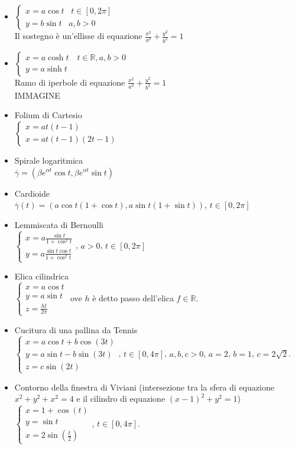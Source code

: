 \documentclass{article}
\newcommand{\R}{\mathbb{R}}
\begin{document}
\begin{itemize}
    \item $\begin{cases}
    x=a \cos t\,\,\,\,\, t \in [0,2\pi]\\
    y= b \sin t\,\,\,\,\, a,b >0
\end{cases}$\\
Il sostegno è un'ellisse di equazione $\frac{x^2}{a^2}+\frac{y^2}{b^2}=1$
    \item $\begin{cases}
        x=a \cosh t\,\,\,\,\,\, t \in \R, a,b>0\\
        y=a \sinh t
    \end{cases}$\\
    Ramo di iperbole di equazione $\frac{x^2}{a^2}+\frac{y^2}{b^2}=1$\\
    IMMAGINE
\item Folium di Cartesio\\
$\begin{cases}
    x= a t(t-1)\\
    x=a t(t-1)(2t-1)
\end{cases}$
\item Spirale logaritmica\\
$ \overline{\gamma}= (\beta e^{\alpha t}\cos t, \beta e^{\alpha t} \sin t)$
\item Cardioide\\
$\overline{\gamma}(t)=(a \cos t (1+\cos t), a \sin t (1+\sin t))$, $t \in [0, 2\pi]$
\item Lemmiscata di Bernoulli\\
$\begin{cases}
    x=a \frac{\sin t}{1+\cos^2 t}\\
    y=a \frac{\sin t \cos t}{1+\cos^2 t}
\end{cases}$, $a >0$, $ t \in [0, 2 \pi]$
\item Elica cilindrica\\
$\begin{cases}
    x=a\cos t\\
    y=a \sin t \\
    z= \frac{ht}{2\pi}
\end{cases}$ ove $h $ è detto passo dell'elica $f \in \R$.
\item Cucitura di una pallina da Tennis\\
$\begin{cases}
    x=a \cos t+ b \cos (3t)\\
    y=a \sin t - b \sin (3t)\\
    z=c \sin (2t)
\end{cases}$, $t\in [0,4 \pi]$, $a,b,c>0$, $a=2$, $b=1$, $c=2\sqrt{2}$.
\item Contorno della finestra di Viviani (intersezione tra la sfera di equazione $x^2+y^2+x^2=4$ e il cilindro di equazione $(x-1)^2+y^2=1$)\\
$\begin{cases}
    x=1+\cos(t)\\
    y=\sin t\\
    x=2 \sin\left(\frac{t}{2}\right)
\end{cases}$, $t \in [0, 4 \pi]$.
\end{itemize}
\end{document}
